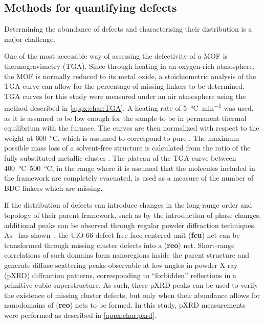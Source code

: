 \subsection{Methods for quantifying defects}

Determining the abundance of defects and characterising their
distribution is a major challenge.

One of the most accessible way of assessing the defectivity of
a MOF is thermogravimetry (TGA). Since through heating in
an oxygen-rich atmosphere, the MOF is normally reduced to
its metal oxide, a stoichiometric analysis of the TGA curve
can allow for the percentage of missing linkers to be
determined. TGA curves for this study were measured under
an air atmosphere using the method described in \autoref{appx:char:TGA}.
A heating rate of \SI{5}{\degreeCelsius\per\minute} was used,
as it is assumed to be low enough for the sample to be in
permanent thermal equilibrium with the furnace.
The curves are then normalized with respect to the weight at
\SI{600}{\degreeCelsius}, which is assumed to correspond to pure
. The maximum possible mass loss of a solvent-free
structure is calculated from the ratio of the fully-substituted
metallic cluster . The plateau
of the TGA curve between \SIrange{400}{500}{\degreeCelsius},
in the range where it is assumed that the molecules included in
the framework are completely evacuated, is used as a measure of the
number of BDC linkers which are missing.

If the distribution of defects can introduce changes in the
long-range order and topology of their parent framework,
such as by the introduction of phase changes,
additional peaks can be observed through regular
powder diffraction techniques.
As~\citeauthor{cliffeCorrelatedDefectNanoregions2014} has
shown~\cite{cliffeCorrelatedDefectNanoregions2014},
the UiO-66 defect-free face-centered unit (\textbf{fcu})
net can be transformed through missing cluster defects into
a (\textbf{reo}) net. Short-range correlations of such domains
form nanoregions inside the parent structure and generate
diffuse scattering peaks observable at low angles in
powder X-ray (pXRD) diffraction patterns, corresponding to ``forbidden''
reflections in a primitive cubic superstructure.
As such, these pXRD peaks can be used to verify the existence of
missing cluster defects, but only when their abundance allows for
nanodomains of (\textbf{reo}) nets to be formed. In this study,
pXRD measurements were performed as described in \autoref{appx:char:pxrd}.

